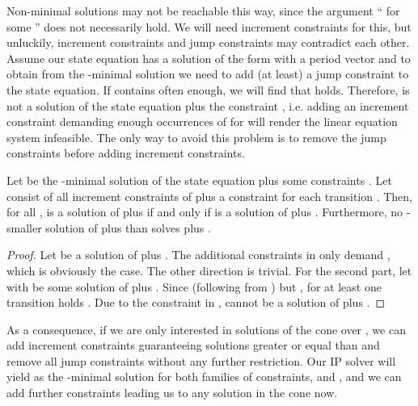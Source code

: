 \documentclass{LMCS}
\begin{document}
Non-minimal solutions may not be reachable this way, since the argument `` for some '' does not necessarily hold.
We will need increment constraints for this, but unluckily, increment constraints and jump constraints may 
contradict each other. Assume our state equation has a solution of the form  with a period vector 
and to obtain  from the -minimal solution  we need to add (at least) a jump constraint  to the state equation.
If  contains  often enough, we will find that  holds. Therefore,  is not a solution of the
state equation plus the constraint , i.e. adding an increment constraint demanding enough occurrences of 
for  will render the linear equation system infeasible. The only way to avoid this problem is to remove the jump
constraints before adding increment constraints.

\begin{lem}
Let  be the -minimal solution of the state equation  plus some constraints . Let  consist of all
increment constraints of  plus a constraint  for each transition . Then, for all ,
 is a solution of  plus  if and only if  is a solution of  plus .
Furthermore, no -smaller solution of  plus  than  solves  plus .
\end{lem}
\begin{proof}
Let  be a solution of  plus . The additional constraints in  only demand , which
is obviously the case. The other direction is trivial. For the second part, let  with  be some solution of
 plus . Since  (following from ) but , for at least one transition  holds . 
Due to the constraint  in ,  cannot be a solution of  plus .
\end{proof}

As a consequence, if we are only interested in solutions of the cone  over , we can add increment constraints guaranteeing
solutions greater or equal than  and remove all jump constraints without any further restriction. Our IP solver will yield  as the -minimal
solution for both families of constraints,  and , and we can add further constraints leading us to any solution in the
cone  now.
\end{document}

